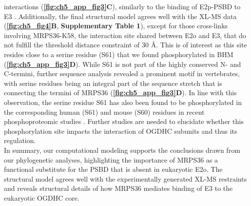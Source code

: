 interactions (\textbf{\autoref{fig:ch5_app_fig3}C}), similarly to the binding of E2p-PSBD to E3 \cite{Mande_1996}. Additionally, the final structural model agrees well with the XL-MS data (\textbf{\autoref{fig:ch5_fig4}B}, \textbf{Supplementary Table 1}), except for those cross-links involving MRPS36-K58, the interaction site shared between E2o and E3, that do not fulfill the threshold distance constraint of 30 Å. This is of interest as this site resides close to a serine residue (S61) that we found phosphorylated in BHM (\textbf{\autoref{fig:ch5_app_fig3}D}). While S61 is not part of the highly conserved N- and C-termini, further sequence analysis revealed a prominent motif in vertebrates, with serine residues being an integral part of the sequence stretch that is connecting the termini of MRPS36 (\textbf{\autoref{fig:ch5_app_fig3}D}). In line with this observation, the serine residue S61 has also been found to be phosphorylated in the corresponding human (S61) and mouse (S60) residues in recent phosphoproteomic studies \cite{Mertins_2016, Sharma_2014, Wilson-Grady_2013}. Further studies are needed to elucidate whether this phosphorylation site impacts the interaction of OGDHC subunits and thus its regulation.\\
In summary, our computational modeling supports the conclusions drawn from our phylogenetic analyses, highlighting the importance of MRPS36 as a functional substitute for the PSBD that is absent in eukaryotic E2o. The structural model agrees well with the experimentally generated XL-MS restraints and reveals structural details of how MRPS36 mediates binding of E3 to the eukaryotic OGDHC core.

